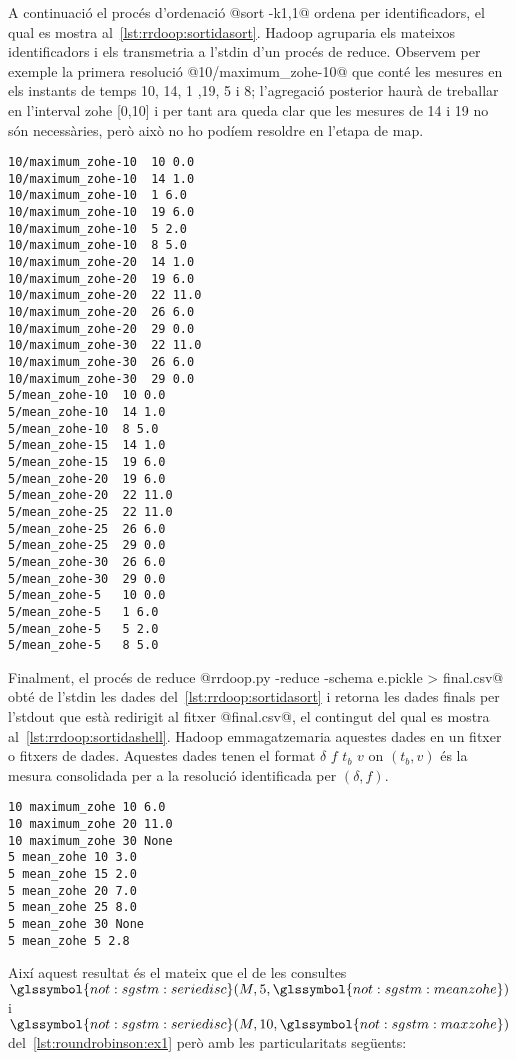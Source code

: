 A continuació el procés d'ordenació @sort -k1,1@ ordena per
identificadors, el qual es mostra
al~\autoref{lst:rrdoop:sortidasort}. Hadoop agruparia els mateixos
identificadors i els transmetria a l'stdin d'un procés de reduce.
Observem per exemple la primera resolució @10/maximum_zohe-10@ que
conté les mesures en els instants de temps 10, 14, 1 ,19, 5 i 8;
l'agregació posterior haurà de treballar en l'interval \gls{zohe}
[0,10] i per tant ara queda clar que les mesures de 14 i 19 no són
necessàries, però això no ho podíem resoldre en l'etapa de map.
\begin{lstlisting}[style=stdout,caption=Sortida del procés d'ordenació,label=lst:rrdoop:sortidasort]
10/maximum_zohe-10	10 0.0
10/maximum_zohe-10	14 1.0
10/maximum_zohe-10	1 6.0
10/maximum_zohe-10	19 6.0
10/maximum_zohe-10	5 2.0
10/maximum_zohe-10	8 5.0
10/maximum_zohe-20	14 1.0
10/maximum_zohe-20	19 6.0
10/maximum_zohe-20	22 11.0
10/maximum_zohe-20	26 6.0
10/maximum_zohe-20	29 0.0
10/maximum_zohe-30	22 11.0
10/maximum_zohe-30	26 6.0
10/maximum_zohe-30	29 0.0
5/mean_zohe-10	10 0.0
5/mean_zohe-10	14 1.0
5/mean_zohe-10	8 5.0
5/mean_zohe-15	14 1.0
5/mean_zohe-15	19 6.0
5/mean_zohe-20	19 6.0
5/mean_zohe-20	22 11.0
5/mean_zohe-25	22 11.0
5/mean_zohe-25	26 6.0
5/mean_zohe-25	29 0.0
5/mean_zohe-30	26 6.0
5/mean_zohe-30	29 0.0
5/mean_zohe-5	10 0.0
5/mean_zohe-5	1 6.0
5/mean_zohe-5	5 2.0
5/mean_zohe-5	8 5.0
\end{lstlisting}


Finalment, el procés de reduce %
@rrdoop.py -reduce -schema e.pickle > final.csv@ obté de l'stdin les
dades del~\autoref{lst:rrdoop:sortidasort} i retorna les dades finals
per l'stdout que està redirigit al fitxer @final.csv@, el contingut
del qual es mostra al~\autoref{lst:rrdoop:sortidashell}.  Hadoop
emmagatzemaria aquestes dades en un fitxer o fitxers de dades.
Aquestes dades tenen el format $\delta$ $f$ $t_b$ $v$ on $(t_b,v)$ és
la mesura consolidada per a la resolució identificada per
$(\delta,f)$.

\begin{lstlisting}[style=file,caption=Dades de sortida final.csv,label=lst:rrdoop:sortidashell]
10 maximum_zohe	10 6.0
10 maximum_zohe	20 11.0
10 maximum_zohe	30 None
5 mean_zohe	10 3.0
5 mean_zohe	15 2.0
5 mean_zohe	20 7.0
5 mean_zohe	25 8.0
5 mean_zohe	30 None
5 mean_zohe	5 2.8
\end{lstlisting}

Així aquest resultat és el mateix que el de les consultes $\glssymbol{not:sgstm:seriedisc}(M,5,\glssymbol{not:sgstm:meanzohe})$ i $\glssymbol{not:sgstm:seriedisc}(M,10,\glssymbol{not:sgstm:maxzohe})$ del~\autoref{lst:roundrobinson:ex1} però amb les particularitats següents:

